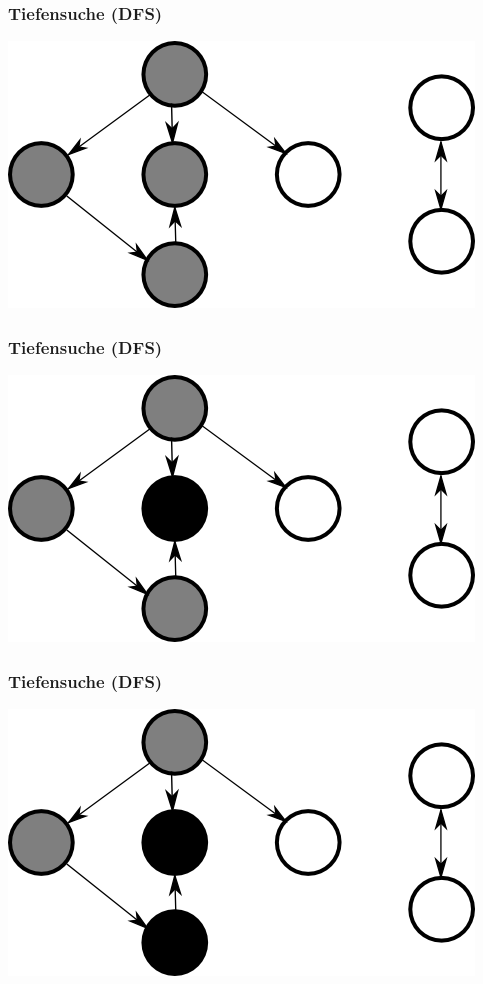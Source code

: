 \documentclass{beamer}
\begin{document}
\begin{frame}
\frametitle{Tiefensuche (DFS)}
\begin{center}
\includegraphics{dfs4}
\end{center}
\end{frame}


\begin{frame}
\frametitle{Tiefensuche (DFS)}
\begin{center}
\includegraphics{dfs5}
\end{center}
\end{frame}


\begin{frame}
\frametitle{Tiefensuche (DFS)}
\begin{center}
\includegraphics{dfs6}
\end{center}
\end{frame}
\end{document}
